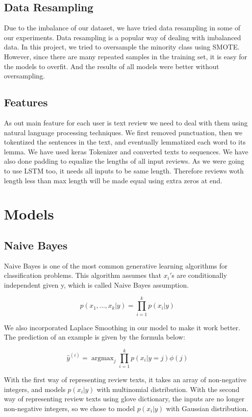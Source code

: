 \documentclass[10pt]{article}
\DeclareMathOperator*{\argmax}{argmax}
\begin{document}
  

\subsection{Data Resampling}

Due to the imbalance of our dataset, we have tried data
resampling in some of our experiments. Data resampling
is a popular way of dealing with imbalanced data. In this
project, we tried to oversample the minority class using SMOTE. However, since there are many
repeated samples in the training set, it is easy for the models to overfit. And the results of all models were better without oversampling. 

\subsection{Features}

As out main feature for each user is text review we need to deal with them using natural language processing techniques. We first removed punctuation, then we tokentized the sentences in the text, and eventually lemmatized each word to its lemma. We have used keras Tokenizer and converted texts to sequences. We have also done padding to equalize the lengths of all input reviews. As we were going to use LSTM too, it needs all inputs to be same length. Therefore reviews woth length less than max length will be made equal using extra zeros at end.

\section{Models}
\subsection{Naive Bayes}

Naive Bayes is one of the most common generative
learning algorithms for classification problems. This algorithm assumes that $x_i'$s are conditionally independent given y, which is called Naive Bayes assumption.

\[p(x_1,...,x_k|y)=\prod_{i=1}^{k} p(x_i|y)\]

We also incorporated Laplace Smoothing in our model to
make it work better. The prediction of an example is given
by the formula below:

\[\hat{y}^{(i)}=\argmax_j\prod_{i=1}^{k} p(x_i|y=j)\phi(j)\]

With the first way of representing review texts, it takes an
array of non-negative integers, and models $p(x_i|y)$ with
multinomial distribution. With the second way of representing review texts using glove dictionary, the inputs are no longer non-negative integers, so we chose to model $p(x_i|y)$
with Gaussian distribution.
\end{document}
